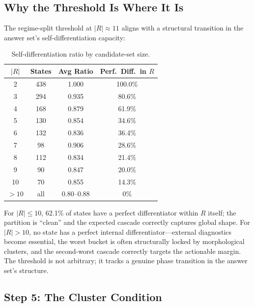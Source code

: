 \documentclass[11pt]{article}
\begin{document}
	\subsection{Why the Threshold Is Where It Is}
	
	The regime-split threshold at $|R| \approx 11$ aligns with a structural transition in the answer set's self-differentiation capacity:
	
	\begin{table}[h]
		\centering
		\caption{Self-differentiation ratio by candidate-set size.}
		\label{tab:selfdiff_by_size}
		\begin{tabular}{@{}cccc@{}}
			\toprule
			$|R|$ & States & Avg Ratio & Perf.\ Diff.\ in $R$ \\
			\midrule
			2 & 438 & 1.000 & 100.0\% \\
			3 & 294 & 0.935 & 80.6\% \\
			4 & 168 & 0.879 & 61.9\% \\
			5 & 130 & 0.854 & 34.6\% \\
			6 & 132 & 0.836 & 36.4\% \\
			7 & 98 & 0.906 & 28.6\% \\
			8 & 112 & 0.834 & 21.4\% \\
			9 & 90 & 0.847 & 20.0\% \\
			10 & 70 & 0.855 & 14.3\% \\
			$> 10$ & all & 0.80--0.88 & 0\% \\
			\bottomrule
		\end{tabular}
	\end{table}
	
	For $|R| \leq 10$, 62.1\% of states have a perfect differentiator within $R$ itself; the partition is ``clean'' and the expected cascade correctly captures global shape.  For $|R| > 10$, no state has a perfect internal differentiator---external diagnostics become essential, the worst bucket is often structurally locked by morphological clusters, and the second-worst cascade correctly targets the actionable margin.  The threshold is not arbitrary; it tracks a genuine phase transition in the answer set's structure.
	
	\subsection{Step 5: The Cluster Condition}
	
\end{document}
